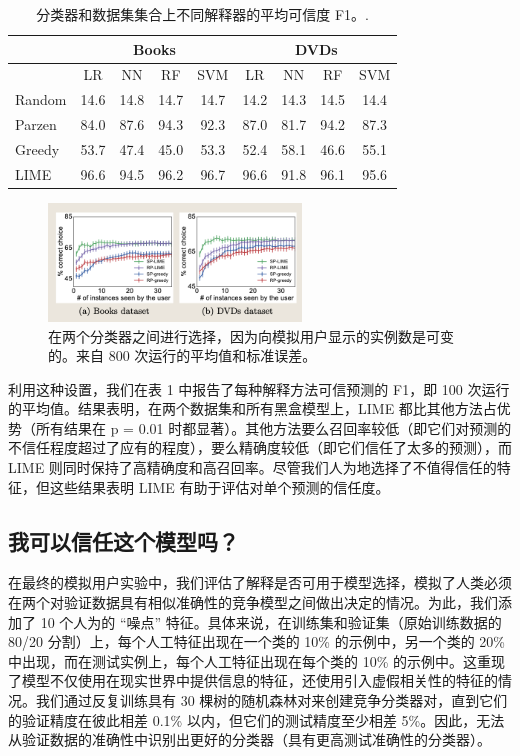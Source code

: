 \documentclass[12pt, a4paper]{ctexart} %
\begin{document}
\begin{table}[htbp]
    \centering
    \caption{分类器和数据集集合上不同解释器的平均可信度 F1。.}
    \begin{tabular}{|l|c|c|c|c|c|c|c|c|}
    \hline
     & \multicolumn{4}{c|}{Books} & \multicolumn{4}{c|}{DVDs} \\
    \hline
     & LR & NN & RF & SVM & LR & NN & RF & SVM \\
    \hline
    Random & 14.6 & 14.8 & 14.7 & 14.7 & 14.2 & 14.3 & 14.5 & 14.4 \\
    \hline
    Parzen & 84.0 & 87.6 & 94.3 & 92.3 & 87.0 & 81.7 & 94.2 & 87.3 \\
    \hline
    Greedy & 53.7 & 47.4 & 45.0 & 53.3 & 52.4 & 58.1 & 46.6 & 55.1 \\
    \hline
    LIME & 96.6 & 94.5 & 96.2 & 96.7 & 96.6 & 91.8 & 96.1 & 95.6 \\
    \hline
    \end{tabular}
\end{table}

\begin{figure}[h]
    \centering
    \includegraphics[width=0.6\textwidth]{img/img_8.png}
    \caption{在两个分类器之间进行选择，因为向模拟用户显示的实例数是可变的。来自 800 次运行的平均值和标准误差。}
    \label{fig:img_8}
\end{figure}
利用这种设置，我们在表 1 中报告了每种解释方法可信预测的 F1，即 100 次运行的平均值。结果表明，在两个数据集和所有黑盒模型上，LIME 都比其他方法占优势（所有结果在 p = 0.01 时都显著）。其他方法要么召回率较低（即它们对预测的不信任程度超过了应有的程度），要么精确度较低（即它们信任了太多的预测），而 LIME 则同时保持了高精确度和高召回率。尽管我们人为地选择了不值得信任的特征，但这些结果表明 LIME 有助于评估对单个预测的信任度。

\subsection{我可以信任这个模型吗？}
在最终的模拟用户实验中，我们评估了解释是否可用于模型选择，模拟了人类必须在两个对验证数据具有相似准确性的竞争模型之间做出决定的情况。为此，我们添加了 10 个人为的 “噪点” 特征。具体来说，在训练集和验证集（原始训练数据的 80/20 分割）上，每个人工特征出现在一个类的 10\% 的示例中，另一个类的 20\% 中出现，而在测试实例上，每个人工特征出现在每个类的 10\% 的示例中。这重现了模型不仅使用在现实世界中提供信息的特征，还使用引入虚假相关性的特征的情况。我们通过反复训练具有 30 棵树的随机森林对来创建竞争分类器对，直到它们的验证精度在彼此相差 0.1\% 以内，但它们的测试精度至少相差 5\%。因此，无法从验证数据的准确性中识别出更好的分类器（具有更高测试准确性的分类器）。
\end{document}
